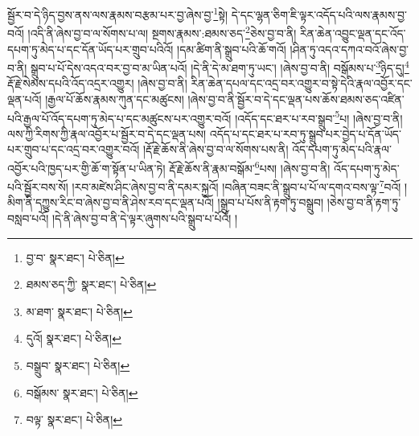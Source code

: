 སྦྱོར་བ་དེ་ཉིད་བྱས་ནས་ལས་རྣམས་བརྩམ་པར་བྱ་ཞེས་བྱ་\footnote{བྱ་བ་  སྣར་ཐང་།  པེ་ཅིན། }སྟེ། དེ་དང་ལྷན་ཅིག་ཇི་ལྟར་འདོད་པའི་ལས་རྣམས་བྱ་བའོ། །འདི་ནི་ཞེས་བྱ་བ་ལ་སོགས་པ་ལ། སྔགས་རྣམས་:ཐམས་ཅད་\footnote{ཐམས་ཅད་ཀྱི་  སྣར་ཐང་།  པེ་ཅིན། }ཅེས་བྱ་བ་ནི། རིན་ཆེན་འབྱུང་ལྡན་དང་འོད་དཔག་ཏུ་མེད་པ་དང་དོན་ཡོད་པར་གྲུབ་པའིའོ། །དམ་ཚིག་ནི་སྒྲུབ་པའི་ཆོ་གའོ། །ཤིན་ཏུ་འདའ་དཀའ་བའོ་ཞེས་བྱ་བ་ནི། སྒྲུབ་པ་པོ་དེས་འདའ་བར་བྱ་བ་མ་ཡིན་པའོ། །དེ་ནི་དེ་མ་ཐག་ཏུ་ཡང་། །ཞེས་བྱ་བ་ནི། བསྒོམས་པ་\footnote{མ་ཐག་  སྣར་ཐང་།  པེ་ཅིན། }ཉིད་དུ།\footnote{དུའོ།  སྣར་ཐང་།  པེ་ཅིན། } རྡོ་རྗེ་སེམས་དཔའི་འོད་འདྲར་འགྱུར། །ཞེས་བྱ་བ་ནི། རིན་ཆེན་དཔལ་དང་འདྲ་བར་འགྱུར་བ་སྟེ་དེའི་རྣལ་འབྱོར་དང་ལྡན་པའོ། །རྒྱལ་པོ་ཆོས་རྣམས་ཀུན་དང་མཚུངས། །ཞེས་བྱ་བ་ནི་སྦྱོར་བ་དེ་དང་ལྡན་པས་ཆོས་ཐམས་ཅད་འཛིན་པའི་རྒྱལ་པོ་འོད་དཔག་ཏུ་མེད་པ་དང་མཚུངས་པར་འགྱུར་བའོ། །འདོད་དང་ཐར་པ་རབ་སྒྲུབ་\footnote{བསྒྲུབ་  སྣར་ཐང་།  པེ་ཅིན། }པ། །ཞེས་བྱ་བ་ནི། ལས་ཀྱི་རིགས་ཀྱི་རྣལ་འབྱོར་པ་སྦྱོར་བ་དེ་དང་ལྡན་པས། འདོད་པ་དང་ཐར་པ་རབ་ཏུ་སྒྲུབ་པར་བྱེད་པ་དོན་ཡོད་པར་གྲུབ་པ་དང་འདྲ་བར་འགྱུར་བའོ། །རྡོ་རྗེ་ཆོས་ནི་ཞེས་བྱ་བ་ལ་སོགས་པས་ནི། འོད་དཔག་ཏུ་མེད་པའི་རྣལ་འབྱོར་པའི་ཁྱད་པར་གྱི་ཆོ་ག་སྟོན་པ་ཡིན་ཏེ། རྡོ་རྗེ་ཆོས་ནི་རྣམ་བསྒོམ་\footnote{བསྒོམས་  སྣར་ཐང་།  པེ་ཅིན། }པས། །ཞེས་བྱ་བ་ནི། འོད་དཔག་ཏུ་མེད་པའི་སྦྱོར་བས་སོ། །རབ་མཛེས་ཤིང་ཞེས་བྱ་བ་ནི་དམར་སྐྱའོ། །བཞིན་བཟང་ནི་སྒྲུབ་པ་པོ་ལ་དགའ་བས་ལྟ་\footnote{བལྟ་  སྣར་ཐང་།  པེ་ཅིན། }བའོ། །མིག་ནི་དཀྱུས་རིང་བ་ཞེས་བྱ་བ་ནི་ཤེས་རབ་དང་ལྡན་པའོ། །སྒྲུབ་པ་པོས་ནི་རྟག་ཏུ་བསྒྲུབ། །ཅེས་བྱ་བ་ནི་རྟག་ཏུ་བསླབ་པའོ། །དེ་ནི་ཞེས་བྱ་བ་ནི་དེ་ལྟར་ཞུགས་པའི་སྒྲུབ་པ་པོའོ། །
